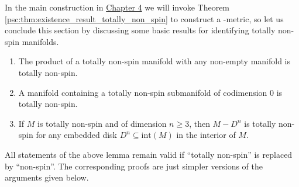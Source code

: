 In the main construction in \hyperref[sec:constr]{Chapter 4} we will invoke Theorem \ref{psc:thm:existence_result_totally_non_spin} to construct a \psc-metric, so let us conclude this section by discussing some basic results for identifying totally non-spin manifolds.

\begin{lemma}
    \label{psc:lem:totally_non_spin_lemma} 
    \begin{enumerate}[label=(\roman*)]
        \item The product of a totally non-spin manifold with any non-empty manifold is totally non-spin. \label{eq:totally_non_spin_lemma1}
        \item A manifold containing a totally non-spin submanifold of codimension $0$ is totally non-spin. \label{eq:totally_non_spin_lemma2}
        \item If $M$ is totally non-spin and of dimension $n \geq 3$, then $M - D^n$ is totally non-spin for any embedded disk $D^n \subseteq \mathrm{int}(M)$ in the interior of $M$. \label{eq:totally_non_spin_lemma3}
    \end{enumerate}
\end{lemma}

\begin{remark}
    All statements of the above lemma remain valid if ``totally non-spin'' is replaced by ``non-spin''. The corresponding proofs are just simpler versions of the arguments given below.
\end{remark}

